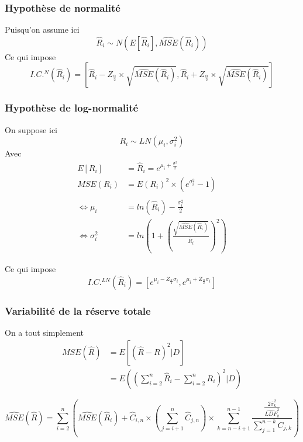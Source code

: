 \subsubsection*{ Hypothèse de normalité}

Puisqu'on assume ici
$$\widehat{R}_i \sim N(E[\widehat{R}_i], \widehat{MSE}(\widehat{R}_i))$$
Ce qui impose
$$\boxed{I.C.^N(\widehat{R}_i)=\left[\widehat{R}_i - Z_{\frac{\alpha}{2}} \times \sqrt{\widehat{MSE}(\widehat{R}_i)}, \widehat{R}_i + Z_{\frac{\alpha}{2}} \times \sqrt{\widehat{MSE}(\widehat{R}_i)} \right]}$$

\subsubsection*{ Hypothèse de log-normalité}

On suppose ici
$$R_i \sim LN(\mu_i, \sigma_i^2)$$
Avec
$$\begin{aligned}
E[R_i] &= \widehat{R}_i = e^{\mu_i + \frac{\sigma^2}{2}} \\
MSE(R_i) &= E(R_i)^2 \times \left(e^{\sigma_i^2}-1 \right) \\ \\
\Leftrightarrow \mu_i &= ln(\widehat{R}_i)-\frac{\sigma_i^2}{2} \\
\Leftrightarrow \sigma_i^2 &= ln \left(1 + \left(\frac{\sqrt{\widehat{MSE}(\widehat{R}_i)}}{\widehat{R}_i}\right)^2 \right)
\end{aligned}$$

Ce qui impose
$$\boxed{I.C.^{LN}(\widehat{R}_i) = \left[e^{\mu_i - Z_{\frac{\alpha}{2}}\sigma_i}, e^{\mu_i + Z_{\frac{\alpha}{2}}\sigma_i} \right]}$$

\subsubsection*{ Variabilité de la réserve totale}

On a tout simplement 
$$\begin{aligned}
MSE(\widehat R) &= E\left[(\widehat{R}-R)^2|D \right] \\
   &= E\left(\left(\sum_{i=2}^n \widehat R_i - \sum_{i=2}^n R_i\right)^2|D \right)
\end{aligned}$$

$$\boxed{\widehat{MSE}(\widehat{R}) = \sum_{i=2}^n \left( \widehat{MSE}(\widehat{R}_i) + \widehat{C}_{i,n} \times \left(\sum_{j=i+1}^n \widehat{C}_{j,n} \right) \times \sum_{k=n-i+1}^{n-1} \frac{\frac{2\widehat{\sigma}_k^2}{\widehat{LDF}_k^2}}{\sum_{j=1}^{n-k} C_{j,k}} \right) }$$

